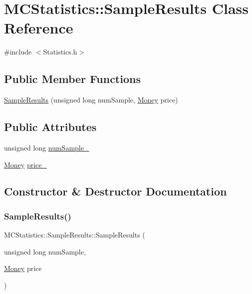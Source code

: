 \hypertarget{class_m_c_statistics_1_1_sample_results}{}\section{M\+C\+Statistics\+:\+:Sample\+Results Class Reference}
\label{class_m_c_statistics_1_1_sample_results}


{\ttfamily \#include $<$Statistics.\+h$>$}

\subsection*{Public Member Functions}
\begin{DoxyCompactItemize}
\item 
\hyperlink{class_m_c_statistics_1_1_sample_results_a49be18ef127e000d7f828ff69813abee}{Sample\+Results} (unsigned long num\+Sample, \hyperlink{_name_def_8h_a5a9d48c16a694e9a2d9f1eca730dc8c5}{Money} price)
\end{DoxyCompactItemize}
\subsection*{Public Attributes}
\begin{DoxyCompactItemize}
\item 
unsigned long \hyperlink{class_m_c_statistics_1_1_sample_results_a068edc7e162d279df3df01df775f431a}{num\+Sample\+\_\+}
\item 
\hyperlink{_name_def_8h_a5a9d48c16a694e9a2d9f1eca730dc8c5}{Money} \hyperlink{class_m_c_statistics_1_1_sample_results_a942ac0f979f34804055ff0f5287516f1}{price\+\_\+}
\end{DoxyCompactItemize}


\subsection{Constructor \& Destructor Documentation}
\hypertarget{class_m_c_statistics_1_1_sample_results_a49be18ef127e000d7f828ff69813abee}{}\label{class_m_c_statistics_1_1_sample_results_a49be18ef127e000d7f828ff69813abee} 
\subsubsection{\texorpdfstring{Sample\+Results()}{SampleResults()}}
{\footnotesize\ttfamily M\+C\+Statistics\+::\+Sample\+Results\+::\+Sample\+Results (\begin{DoxyParamCaption}\item[{unsigned long}]{num\+Sample,  }\item[{\hyperlink{_name_def_8h_a5a9d48c16a694e9a2d9f1eca730dc8c5}{Money}}]{price }\end{DoxyParamCaption})\hspace{0.3cm}{\ttfamily [inline]}}



